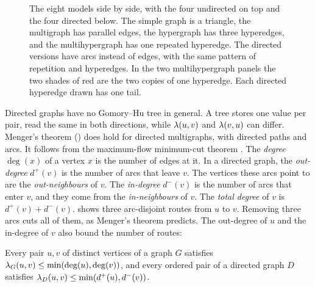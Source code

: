 \begin{figure}[ht]
{}
\caption{The eight models side by side, with the four undirected on top and the four directed below. The simple graph is a triangle, the multigraph has parallel edges, the hypergraph has three hyperedges, and the multihypergraph has one repeated hyperedge. The directed versions have arcs instead of edges, with the same pattern of repetition and hyperedges. In the two multihypergraph panels the two shades of red are the two copies of one hyperedge. Each directed hyperedge drawn has one tail.}
\label{fig:eight-models}
\end{figure}

Directed graphs have no Gomory--Hu tree in general. A tree stores one value per pair, read the same in both directions, while $\lambda(u,v)$ and $\lambda(v,u)$ can differ. Menger's theorem () does hold for directed multigraphs, with directed paths and arcs. It follows from the maximum-flow minimum-cut theorem \cite[Theorem~6.2.2 and Corollary~6.2.3]{Diestel25}.
The \emph{degree} $\deg(x)$ of a vertex $x$ is the number of edges at it.
In a directed graph, the \emph{out-degree} $d^+(v)$ is the number of arcs that leave $v$.
The vertices these arcs point to are the \emph{out-neighbours} of $v$.
The \emph{in-degree} $d^-(v)$ is the number of arcs that enter $v$, and they come from the \emph{in-neighbours} of $v$.
The \emph{total degree} of $v$ is $d^+(v)+d^-(v)$.
 shows three arc-disjoint routes from $u$ to $v$.
Removing three arcs cuts all of them, as Menger's theorem predicts.
The out-degree of $u$ and the in-degree of $v$ also bound the number of routes:

\begin{lemma}\label{lem:degree-bound}
Every pair $u, v$ of distinct vertices of a graph $G$ satisfies $\lambda_G(u, v) \le \min(\deg(u), \deg(v))$, and every ordered pair of a directed graph $D$ satisfies $\lambda_D(u, v) \le \min(d^+(u), d^-(v))$.
\end{lemma}

